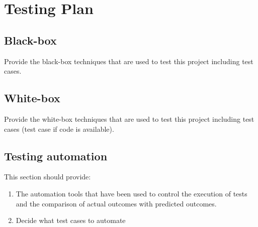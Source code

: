 \chapter{Testing Plan}

\section{Black-box}

Provide the black-box techniques that are used to test this project including test cases.

\section{White-box}

Provide the white-box techniques that are used to test this project including test cases (test case if code is available).

\section{Testing automation}

This section should provide:
\begin{enumerate}
\item The automation tools that have been used to control the execution of tests and the comparison of actual outcomes with predicted outcomes.
\item Decide what test cases to automate
\end{enumerate}

